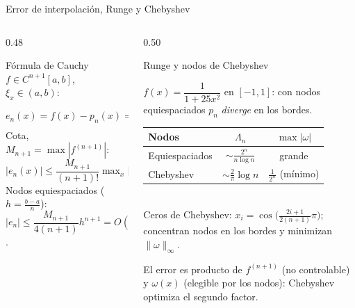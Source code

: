 \documentclass[aspectratio=169,10pt]{beamer}
\begin{document}
\begin{frame}{Error de interpolación, Runge y Chebyshev}
\begin{columns}[T]
\begin{column}{0.48\textwidth}
\begin{cardidea}{Fórmula de Cauchy}{\faSuperscript}
{\footnotesize $f\in C^{n+1}[a,b]$, $\xi_x\in(a,b)$:\\[0.4mm]
$e_n(x)=f(x)-p_n(x)=\dfrac{f^{(n+1)}(\xi_x)}{(n+1)!}\displaystyle\prod_{i=0}^n(x-x_i)$\\[1.4mm]
Cota, $M_{n+1}=\max|f^{(n+1)}|$:\\[0.2mm]
$|e_n(x)|\le\dfrac{M_{n+1}}{(n+1)!}\max_x\Big|\prod_i(x-x_i)\Big|$\\[1.2mm]
Nodos equiespaciados ($h=\tfrac{b-a}{n}$): $|e_n|\le\dfrac{M_{n+1}}{4(n+1)}h^{n+1}=O(h^{n+1})$.}
\end{cardidea}
\end{column}
\begin{column}{0.50\textwidth}
\begin{cardgear}{Runge y nodos de Chebyshev}{\faChartLine}
{\footnotesize $f(x)=\dfrac{1}{1+25x^2}$ en $[-1,1]$: con nodos equiespaciados $p_n$ \emph{diverge} en los bordes.\\[1.0mm]
\centering
\renewcommand{\arraystretch}{1.18}\setlength{\tabcolsep}{6pt}
\begin{tabular}{l|cc}
Nodos & $\Lambda_n$ & $\max|\omega|$\\\hline
Equiespaciados & $\sim\tfrac{2^n}{n\log n}$ & grande\\
Chebyshev & $\sim\tfrac{2}{\pi}\log n$ & $\tfrac{1}{2^n}$ (mínimo)\\
\end{tabular}}\\[1.2mm]
{\footnotesize Ceros de Chebyshev: $x_i=\cos\!\big(\tfrac{2i+1}{2(n+1)}\pi\big)$; concentran nodos en los bordes y minimizan $\|\omega\|_\infty$.}
\end{cardgear}
\vspace{1mm}
\begin{cardnota}[\faInfoCircle]
{\footnotesize El error es producto de $f^{(n+1)}$ (no controlable) y $\omega(x)$ (elegible por los nodos): Chebyshev optimiza el segundo factor.}
\end{cardnota}
\end{column}
\end{columns}
\end{frame}
\end{document}
